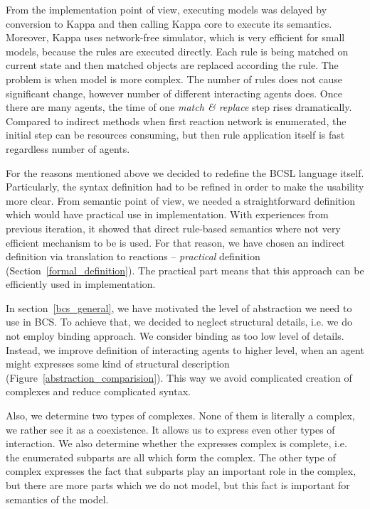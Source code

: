 \documentclass[12pt]{fithesis2}
\begin{document}
From the implementation point of view, executing models was delayed by conversion to Kappa and then calling Kappa core to execute its semantics. Moreover, Kappa uses network-free simulator, which is very efficient for small models, because the rules are executed directly. Each rule is being matched on current state and then matched objects are replaced according the rule. The problem is when model is more complex. The number of rules does not cause significant change, however number of different interacting agents does. Once there are many agents, the time of one \emph{match \& replace} step rises dramatically. Compared to indirect methods when first reaction network is enumerated, the initial step can be resources consuming, but then rule application itself is fast regardless number of agents.

For the reasons mentioned above we decided to redefine the BCSL language itself. Particularly, the syntax definition had to be refined in order to make the usability more clear. From semantic point of view, we needed a straightforward definition which would have practical use in implementation. With experiences from previous iteration, it showed that direct rule-based semantics where not very efficient mechanism to be is used. For that reason, we have chosen an indirect definition via translation to reactions -- \emph{practical} definition (Section~\ref{formal_definition}). The practical part means that this approach can be efficiently used in implementation.

In section~\ref{bcs_general}, we have motivated the level of abstraction we need to use in BCS. To achieve that, we decided to neglect structural details, i.e. we do not employ binding approach. We consider binding as too low level of details. Instead, we improve definition of interacting agents to higher level, when an agent might expresses some kind of structural description (Figure~\ref{abstraction_comparision}). This way we avoid complicated creation of complexes and reduce complicated syntax.

Also, we determine two types of complexes. None of them is literally a complex, we rather see it as a coexistence. It allows us to express even other types of interaction. We also determine whether the expresses complex is complete, i.e. the enumerated subparts are all which form the complex. The other type of complex expresses the fact that subparts play an important role in the complex, but there are more parts which we do not model, but this fact is important for semantics of the model.
\end{document}

